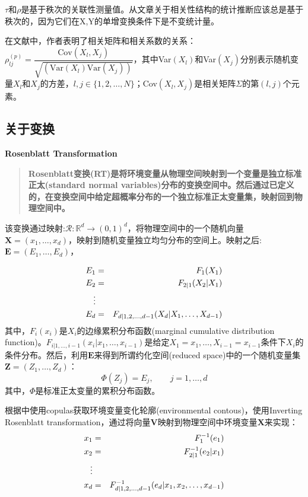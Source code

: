 \textcolor[rgb]{1,0,0}{$\tau$和$\rho$是基于秩次的关联性测量值。从文章\cite{Genest2007}关于相关性结构的统计推断应该总是基于秩次的，因为它们在X,Y的单增变换条件下是不变统计量。}


在文献\cite{Deligiannis2012}中，作者表明了相关矩阵和相关系数的关系：$\rho_{lj}^{(p)} = \dfrac{\text{Cov}(X_l,X_j)}{\sqrt{\left(\text{Var}(X_l)\text{Var}(X_j)\right)}}$，其中Var$(X_l)$和Var$(X_j)$分别表示随机变量$X_l$和$X_j$的方差，$l,j \in \{1,2,\dots,N\}$；Cov$(X_l,X_j)$是相关矩阵$\Sigma$的第$(l,j)$个元素。



\subsection{关于变换}
\textbf{\textcolor[rgb]{1,0,0}{Rosenblatt Transformation}}
\begin{quotation}
    \textbf{\textcolor[rgb]{1,0,0}{Rosenblatt变换(RT)是将环境变量从物理空间映射到一个变量是独立标准正太(standard normal variables)分布的变换空间中。然后通过已定义的，在变换空间中给定超概率分布的一个独立标准正太变量集，映射回到物理空间中。}}\cite{Montes2015}
\end{quotation}


该变换通过映射:$\mathcal{R}: \mathbb{R}^d \rightarrow (0,1)^d$，将物理空间中的一个随机向量$\mathbf{X}=(x_1,\dots,x_d)$，映射到随机变量独立均匀分布的空间上。映射之后:$\mathbf{E} = (E_1,\dots,E_d)$\cite{Montes2015}，

\begin{eqnarray}
    E_1 &=& F_1(X_1)  \notag \\
    E_2 &=& F_{2|1}(X_2|X_1) \notag \\
    \vdots \\
    E_d &=& F_{d|1,2,\dots,d-1} (X_d | X_1,\dots,X_{d-1}) \notag
    \label{eq-rosenblatt}
\end{eqnarray}
其中，$F_i(x_i)$是$X_i$的\textcolor[rgb]{1,0,0}{边缘累积分布函数(marginal cumulative distribution function)}。$F_{i|1,\dots,i-1}(x_i|x_1,\dots,x_{i-1})$是给定$X_1 = x_1,\dots,X_{i-1}=x_{i-1}$条件下$X_i$的条件分布。然后，利用$\mathbf{E}$来得到所谓\textcolor[rgb]{1,0,0}{约化空间(reduced space)}中的一个随机变量集$\mathbf{Z} = (Z_1,\dots,Z_d)$：
\begin{equation}
    \Phi (Z_j) = E_j, \qquad j=1,\dots,d
    \label{eq-cdf}
\end{equation}
其中，$\Phi$是标准正太变量的累积分布函数。

根据\cite{Montes2015}中使用copulas获取环境变量变化轮廓(environmental contous)，使用\textcolor[rgb]{1,0,0}{Inverting Rosenblatt transformation}，通过将向量$\mathbf{V}$映射到物理空间中环境变量$\mathbf{X}$来实现：
\begin{eqnarray}
    \label{eq-invervse-rosenblatt}
    x_1 &=& F_1^{-1}(e_1)  \notag \\
    x_2 &=& F_{2|1}^{-1}(e_2|x_1) \notag \\
    \vdots \\
    x_d &=& F_{d|1,2,\dots,d-1}^{-1} (e_d | x_1,x_2,\dots,x_{d-1}) \notag
\end{eqnarray}

